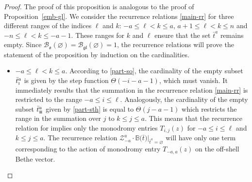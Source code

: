 \documentclass[10pt,a4paper]{amsart}
\newcommand{\so}{\scriptscriptstyle \rm I}
\newcommand{\sth}{\scriptscriptstyle \rm I\hspace{-1pt}I\hspace{-1pt}I}
\newcommand{\bt}{{\bar t}}
\theoremstyle{definition}
\def\BB{{\mathbb{B}}}
\def\r#1{\eqref{#1}}
\def\cBo{\mathcal{B}_{\mathfrak{o}}}
\def\cBg{\mathcal{B}_{\mathfrak{gl}}}
\def\Z{\mathcal{Z}}
\begin{document}
\begin{proof}
The proof of this proposition is analogous to the proof of Proposition~\ref{emb-gl}.
We consider the recurrence
relations \r{main-rr} for three different ranges of the indices $\ell$ and $k$:
$-a\leq \ell<k\leq a$, $a+1\leq \ell<k\leq n$ and $-n\leq \ell<k\leq -a-1$.
These ranges for $k$ and $\ell$ ensure that the set $\bt^a$ remains empty.
Since
$\cBo(\varnothing) = \cBg(\varnothing) = 1$, the recurrence relations will prove the statement of the proposition by induction on the cardinalities.
\begin{itemize}\itemsep=0pt
\item $-a\leq \ell<k\leq a$. According to \r{part-so}, the cardinality of the empty subset $\bt^a_{\so}$
is given by the step function
$\Theta(-i-a-1)$, which must vanish. It immediately results that the summation
in the recurrence relation \eqref{main-rr} is restricted to the range $-a\leq i\leq \ell$.
Analogously, the cardinality of the empty subset $\bt^a_{\sth}$ given by \r{part-sth}
is equal to $\Theta(j-a-1)$ which restricts the range in the summation
over $j$ to $k\leq j\leq a$. This means that the recurrence relation
for \smash{$\Z^k_\ell\cdot
\BB\bigl(\bt\bigr)|_{\bt^a=\varnothing}$}
implies only the monodromy entries $T_{i,j}(z)$ for $-a\leq i\leq \ell$ and
$k\leq j\leq a$. The recurrence relation $\Z^a_{-a}\cdot
\BB\bigl(\bt\bigr)|_{\bt^a=\varnothing}$ will have only one term corresponding to the action of
monodromy entry $T_{-a,a}(z)$ on the off-shell Bethe vector.


\end{itemize}
\end{proof}
\end{document}
